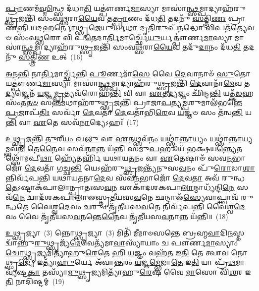 \-\ul{𑌪𑍍𑌰𑌾}\-𑌣𑌮᳴\-\ul{𑌸𑍍𑌮𑌿}\-𑌨𑍍𑌥𑍍𑌸 𑌦᳴𑌧𑌾\-\ul{𑌤𑌿} 𑌯𑌤𑍍𑌪𑍗॑𑌰𑍍𑌣\-\ul{𑌮𑌾}\-𑌸𑍍𑌯𑌾 𑌮𑌾𑌸𑌾॑\-\ul{𑌨𑍍𑌥𑍍𑌸}\-𑌮𑍍𑌪𑌾𑌦𑍍𑌯𑌾𑌹᳴𑌰𑍁\-\ul{𑌥𑍍𑌸𑍃}\-𑌜𑌨𑍍𑌤𑌿᳴ 𑌸𑌂𑌵\-\ul{𑌥𑍍𑌸}\-𑌰𑌾\-\ul{𑌯𑍈}\-𑌵 𑌤\-\ul{𑌤𑍍𑌪𑍍𑌰𑌾}\-𑌣𑌂 𑌦᳴𑌧\-\ul{𑌤𑌿} 𑌤𑌦𑌨𑍁᳴ \ul{𑌸}\-𑌤𑍍𑌤𑍍𑌰𑌿\-\ul{𑌣𑌃} 𑌪𑍍𑌰𑌾𑌣᳴\-\ul{𑌨𑍍𑌤𑌿} 𑌯𑌦\-\ul{𑌹}\-𑌰𑍍𑌨𑍋\-\ul{𑌥𑍍𑌸𑍃}\-𑌜𑍇\-\ul{𑌯𑍁}\-𑌰𑍍𑌯\-\ul{𑌥𑌾} 𑌦𑍃\-\ul{𑌤𑌿}\-𑌰𑍁𑌪᳴𑌨𑌦𑍍𑌧𑍋 \ul{𑌵𑌿}\-𑌪𑌤᳴\-\ul{𑌤𑍍𑌯𑍇}\-𑌵𑍞 𑌸𑌂᳴𑌵\-\ul{𑌥𑍍𑌸}\-𑌰𑍋 𑌵𑌿 𑌪᳴\-\ul{𑌤𑍇}\-𑌦𑌾\-\ul{𑌰𑍍𑌤𑌿}\-𑌮𑌾𑌰𑍍𑌚𑍍𑌛𑍇᳴\-\ul{𑌯𑍁}\-𑌰𑍍𑌯𑌤𑍍𑌪𑍗॑𑌰𑍍𑌣\-\ul{𑌮𑌾}\-𑌸𑍍𑌯𑌾 𑌮𑌾𑌸𑌾॑\-\ul{𑌨𑍍𑌥𑍍𑌸}\-𑌮𑍍𑌪𑌾𑌦𑍍𑌯𑌾𑌹᳴𑌰𑍁\-\ul{𑌥𑍍𑌸𑍃}\-𑌜𑌨𑍍𑌤𑌿᳴ 𑌸𑌂𑌵\-\ul{𑌥𑍍𑌸}\-𑌰𑌾\-\ul{𑌯𑍈}\-𑌵 𑌤𑌦𑍁᳴\-\ul{𑌦𑌾}\-𑌨𑌂 𑌦᳴𑌧\-\ul{𑌤𑌿} 𑌤𑌦𑌨𑍁᳴ \ul{𑌸}\-𑌤𑍍𑌤𑍍𑌰𑌿\-\ul{𑌣} 𑌉𑌤𑍍~(16)

\-\ul{𑌅}\-\-\ul{𑌨}\-\-\ul{𑌨𑍍𑌤𑌿} 𑌨𑌾\-\ul{𑌰𑍍𑌤𑌿}\-𑌮𑌾𑌰𑍍𑌚𑍍𑌛᳴𑌨𑍍𑌤𑌿 \ul{𑌪𑍂}\-𑌰𑍍𑌣𑌮𑌾᳴\-\ul{𑌸𑍇} 𑌵𑍈 \ul{𑌦𑍇}\-𑌵𑌾𑌨𑌾𑍞᳴ \ul{𑌸𑍁}\-𑌤𑍋 𑌯𑌤𑍍𑌪𑍗॑𑌰𑍍𑌣\-\ul{𑌮𑌾}\-𑌸𑍍𑌯𑌾 𑌮𑌾𑌸𑌾॑\-\ul{𑌨𑍍𑌥𑍍𑌸}\-𑌮𑍍𑌪𑌾𑌦𑍍𑌯𑌾𑌹᳴𑌰𑍁\-\ul{𑌥𑍍𑌸𑍃}\-𑌜𑌨𑍍𑌤𑌿᳴ \ul{𑌦𑍇}\-𑌵𑌾𑌨𑌾᳴\-\ul{𑌮𑍇}\-𑌵 𑌤\-\ul{𑌦𑍍𑌯}\-𑌜𑍍𑌞𑍇𑌨᳴ \ul{𑌯}\-𑌜𑍍𑌞\-\ul{𑌮𑍍𑌪𑍍𑌰}\-𑌤𑍍𑌯𑌵᳴𑌰𑍋𑌹\-\ul{𑌨𑍍𑌤𑌿} 𑌵𑌿 𑌵𑌾 \ul{𑌏}\-𑌤\-\ul{𑌦𑍍𑌯}\-𑌜𑍍𑌞𑌂 𑌛𑌿᳴𑌨𑍍𑌦\-\ul{𑌨𑍍𑌤𑌿} 𑌯𑌤𑍍𑌷᳴\-\ul{𑌡}\-𑌹𑌸𑌂᳴𑌤\-\ul{𑌤}\-\-\ul{𑍞} 𑌸\-\ul{𑌨𑍍𑌤}\-𑌮𑌥𑌾𑌹᳴𑌰𑍁\-\ul{𑌥𑍍𑌸𑍃}\-𑌜𑌨𑍍𑌤𑌿᳴ 𑌪𑍍𑌰𑌾𑌜𑌾\-\ul{𑌪}\-𑌤𑍍𑌯\-\ul{𑌮𑍍𑌪}\-𑌶𑍁𑌮𑌾𑌲᳴𑌭𑌨𑍍𑌤𑍇 \ul{𑌪𑍍𑌰}\-𑌜𑌾𑌪᳴\-\ul{𑌤𑌿𑌃} 𑌸𑌰𑍍𑌵𑌾᳴ \ul{𑌦𑍇}\-𑌵𑌤𑌾᳴ \ul{𑌦𑍇}\-𑌵𑌤𑌾᳴𑌭𑌿\-\ul{𑌰𑍇}\-𑌵 \ul{𑌯}\-𑌜𑍍𑌞𑍞 𑌸𑌂 𑌤᳴𑌨𑍍𑌵\-\ul{𑌨𑍍𑌤𑌿} 𑌯\-\ul{𑌨𑍍𑌤𑌿} 𑌵𑌾 \ul{𑌏}\-𑌤𑍇 𑌸𑌵᳴\-\ul{𑌨𑌾}\-𑌦𑍍𑌯𑍇\-𑌽𑌹𑌃᳴~(17)

\-\ul{𑌉}\-\-\ul{𑌥𑍍𑌸𑍃}\-𑌜𑌨𑍍𑌤𑌿᳴ \ul{𑌤𑍁}\-𑌰𑍀\-\ul{𑌯𑌂} 𑌖\-\ul{𑌲𑍁} 𑌵𑌾 \ul{𑌏}\-𑌤𑌥𑍍𑌸𑌵᳴\-\ul{𑌨𑌂} 𑌯𑌥𑍍𑌸𑌾॑\-\ul{𑌨𑍍𑌨𑌾}\-𑌯𑍍𑌯𑌂 𑌯𑌥𑍍𑌸𑌾॑\-\ul{𑌨𑍍𑌨𑌾}\-𑌯𑍍𑌯𑌮𑍍𑌭𑌵᳴\-\ul{𑌤𑌿} 𑌤𑍇\-\ul{𑌨𑍈}\-𑌵 𑌸𑌵᳴\-\ul{𑌨𑌾}\-𑌨𑍍𑌨 𑌯᳴𑌨𑍍𑌤𑌿 𑌸𑌮𑍁\-\ul{𑌪}\-𑌹𑍂𑌯᳴ 𑌭𑌕𑍍𑌷𑌯\-\ul{𑌨𑍍𑌤𑍍𑌯𑍇}\-𑌤𑌥𑍍𑌸𑍋᳴𑌮𑌪𑍀\-\ul{𑌥𑌾} 𑌹𑍍𑌯𑍇᳴𑌤𑌰𑍍\mbox{}𑌹𑌿᳴ 𑌯𑌥𑌾𑌯\-\ul{𑌤}\-𑌨𑌂 𑌵𑌾 \ul{𑌏}\-𑌤𑍇𑌷𑌾𑍞᳴ 𑌸𑌵\-\ul{𑌨}\-𑌭𑌾𑌜𑍋᳴ \ul{𑌦𑍇}\-𑌵𑌤𑌾᳴ 𑌗𑌚𑍍𑌛\-\ul{𑌨𑍍𑌤𑌿} 𑌯𑍇\-𑌽𑌹᳴𑌰𑍁\-\ul{𑌥𑍍𑌸𑍃}\-𑌜𑌨𑍍𑌤𑍍𑌯᳴𑌨𑍁𑌸\-\ul{𑌵}\-𑌨𑌂 𑌪𑍁᳴\-\ul{𑌰𑍋}\-𑌡𑌾\-\ul{𑌶𑌾}\-𑌨𑍍𑌨𑌿𑌰𑍍𑌵᳴𑌪𑌨𑍍𑌤𑌿 𑌯𑌥𑌾𑌯\-\ul{𑌤}\-𑌨𑌾\-\ul{𑌦𑍇}\-𑌵 𑌸᳴𑌵\-\ul{𑌨}\-𑌭𑌾𑌜𑍋᳴ \ul{𑌦𑍇}\-𑌵\-\ul{𑌤𑌾} 𑌅𑌵᳴ 𑌰𑍁𑌨𑍍𑌧\-\ul{𑌤𑍇}\-\-𑌽𑌷𑍍𑌟𑌾𑌕᳴𑌪𑌾𑌲𑌾𑌨𑍍𑌪𑍍𑌰𑌾𑌤𑌃𑌸\-\ul{𑌵}\-𑌨 𑌏𑌕𑌾᳴\-𑌦𑌶\-𑌕𑌪𑌾\-\ul{𑌲𑌾}\-\-𑌨𑍍𑌮𑌾𑌧𑍍𑌯᳴𑌨𑍍𑌦𑌿\-\ul{𑌨𑍇} 𑌸𑌵᳴\-\ul{𑌨𑍇} 𑌦𑍍𑌵𑌾𑌦᳴𑌶\-𑌕𑌪𑌾𑌲𑌾𑍟𑌸𑍍𑌤𑍃𑌤𑍀𑌯𑌸\-\ul{𑌵}\-𑌨𑍇 𑌛𑌨𑍍𑌦𑌾𑍟᳴\-\ul{𑌸𑍍𑌯𑍇}\-𑌵𑌾𑌪𑍍𑌤𑍍𑌵𑌾𑌵᳴ 𑌰𑍁𑌨𑍍𑌧𑌤𑍇 𑌵𑍈𑌶𑍍𑌵\-\ul{𑌦𑍇}\-𑌵𑌂 \ul{𑌚}\-𑌰𑍁𑌂 𑌤𑍃᳴𑌤𑍀𑌯𑌸\-\ul{𑌵}\-𑌨𑍇 𑌨𑌿𑌰𑍍𑌵᳴𑌪𑌨𑍍𑌤𑌿 𑌵𑍈𑌶𑍍𑌵\-\ul{𑌦𑍇}\-𑌵𑌂 𑌵𑍈 𑌤𑍃᳴𑌤𑍀𑌯𑌸\-\ul{𑌵}\-𑌨𑌨𑍍𑌤𑍇\-\ul{𑌨𑍈}\-𑌵 𑌤𑍃᳴𑌤𑍀𑌯𑌸\-\ul{𑌵}\-𑌨𑌾𑌨𑍍𑌨 𑌯᳴𑌨𑍍𑌤𑌿॥~(18)

{\anuvakamend[{\-\ul{𑌉}\-𑌦\-\ul{𑌚}\-𑌤𑍍𑌯𑍁𑌦𑍍𑌯𑍇\-𑌽𑌹᳴\-\ul{𑌰𑌾}\-𑌪𑍍𑌤𑍍𑌵𑌾 𑌪𑌞𑍍𑌚᳴𑌦𑌶 𑌚}]}%

\-\ul{𑌉}\-𑌥𑍍𑌸𑍃𑌜𑍍𑌯𑌾~(3) 𑌨𑍍𑌨𑍋𑌥𑍍𑌸𑍃𑌜𑍍𑌯𑌾~(3) 𑌮𑌿𑌤𑌿᳴ 𑌮𑍀𑌮𑌾𑍞𑌸𑌨𑍍𑌤𑍇 𑌬𑍍𑌰𑌹𑍍𑌮\-\ul{𑌵𑌾}\-𑌦𑌿\-\ul{𑌨}\-𑌸𑍍𑌤𑌦𑍍𑌵𑌾᳴𑌹𑍁\-\ul{𑌰𑍁}\-𑌥𑍍𑌸𑍃𑌜𑍍𑌯᳴\-\ul{𑌮𑍇}\-𑌵𑍇𑌤𑍍𑌯᳴𑌮𑌾\-\ul{𑌵𑌾}\-𑌸𑍍𑌯𑌾᳴𑌯𑌾𑌂 𑌚 𑌪𑍗𑌰𑍍𑌣\-\ul{𑌮𑌾}\-𑌸𑍍𑌯𑌾𑌂 \ul{𑌚𑍋}\-𑌥𑍍𑌸𑍃\-\ul{𑌜𑍍𑌯}\-𑌮𑌿𑌤𑍍𑌯𑌾᳴𑌹𑍁\-\ul{𑌰𑍇}\-𑌤𑍇 𑌹𑌿 \ul{𑌯}\-𑌜𑍍𑌞𑌂 𑌵𑌹᳴\-\ul{𑌤} 𑌇\-\ul{𑌤𑌿} 𑌤𑍇 𑌤𑍍𑌵𑌾𑌵 𑌨𑍋𑌥𑍍𑌸𑍃\-\ul{𑌜𑍍𑌯𑍇} 𑌇𑌤𑍍𑌯𑌾᳴\-\ul{𑌹𑍁}\-𑌰𑍍𑌯𑍇 𑌅᳴𑌵𑌾\-\ul{𑌨𑍍𑌤}\-𑌰𑌂 \ul{𑌯}\-𑌜𑍍𑌞\-\ul{𑌮𑍍𑌭𑍇}\-𑌜𑌾\-\ul{𑌤𑍇} 𑌇\-\ul{𑌤𑌿} 𑌯𑌾 𑌪𑍍𑌰᳴\-\ul{𑌥}\-𑌮𑌾 𑌵𑍍𑌯᳴𑌷𑍍𑌟\-\ul{𑌕𑌾} 𑌤𑌸𑍍𑌯𑌾᳴\-\ul{𑌮𑍁}\-𑌥𑍍𑌸𑍃\-\ul{𑌜𑍍𑌯}\-𑌮𑌿𑌤𑍍𑌯𑌾᳴𑌹𑍁\-\ul{𑌰𑍇}\-𑌷 𑌵𑍈 \ul{𑌮𑌾}\-𑌸𑍋 𑌵𑌿᳴\-\ul{𑌶}\-𑌰 𑌇\-\ul{𑌤𑌿} 𑌨𑌾𑌦𑌿᳴𑌷𑍍𑌟𑌮𑍍~(19)

